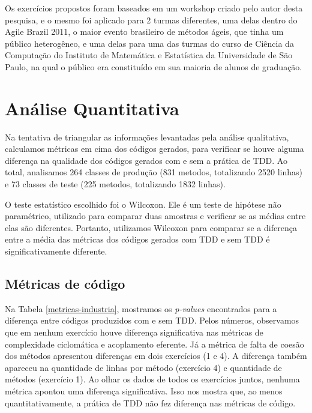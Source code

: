 \documentclass[conference]{IEEEtran}
\begin{document}
Os exercícios propostos foram baseados em um workshop criado pelo autor desta pesquisa, e o mesmo
foi aplicado para 2 turmas diferentes, uma delas dentro do Agile Brazil 2011, o
maior evento brasileiro de métodos ágeis, que tinha um público heterogêneo, e uma delas para
uma das turmas do curso de Ciência da Computação do Instituto de Matemática e Estatística da Universidade
de São Paulo, na qual o público era constituído em sua maioria de alunos de graduação. 

\section{Análise Quantitativa}

Na tentativa de triangular as informações levantadas pela análise qualitativa,
calculamos métricas em cima dos códigos gerados, para verificar se houve
alguma diferença na qualidade dos códigos gerados com e sem a prática de TDD.
Ao total, analisamos
264 classes de produção (831 metodos, totalizando 2520 linhas) e
73 classes de teste (225 metodos, totalizando 1832 linhas).

O teste estatístico escolhido foi o Wilcoxon. Ele é um teste de hipótese não paramétrico,
utilizado para comparar duas amostras e verificar se as médias entre elas
são diferentes. Portanto, utilizamos Wilcoxon para comparar se a diferença entre a média
das métricas dos códigos gerados com TDD e sem TDD é significativamente diferente.


\subsection{Métricas de código}

Na Tabela \ref{metricas-industria}, mostramos os \textit{p-values} encontrados para
a diferença entre códigos produzidos com e sem TDD. 
Pelos números, 
observamos que em nenhum exercício houve diferença significativa nas métricas
de complexidade ciclomática e acoplamento eferente. Já a métrica de falta
de coesão dos métodos apresentou diferenças em dois exercícios (1 e 4). 
A diferença também apareceu na quantidade de linhas por método (exercício 4)
e quantidade de métodos (exercício 1). Ao olhar os dados de todos os exercícios
juntos, nenhuma métrica apontou uma diferença significativa.
Isso nos mostra que, ao menos quantitativamente, a prática de TDD não fez
diferença nas métricas de código.
\end{document}
